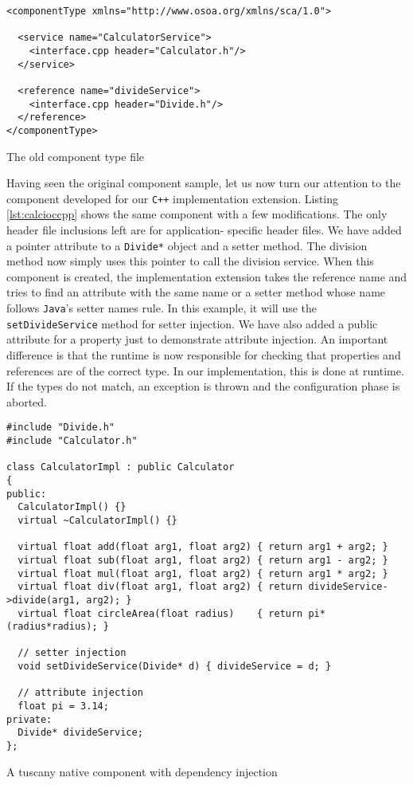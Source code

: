 \begin{listing}
\begin{verbatim}
<componentType xmlns="http://www.osoa.org/xmlns/sca/1.0">

  <service name="CalculatorService">
    <interface.cpp header="Calculator.h"/>
  </service>

  <reference name="divideService">
    <interface.cpp header="Divide.h"/>
  </reference>
</componentType>
\end{verbatim}
\caption{The old component type file}
\label{lst:calccppccomponenttype}
\end{listing}

Having seen the original component sample, let us now turn our attention to the component
developed for our \texttt{C++} implementation extension. Listing \ref{lst:calcioccpp} shows the same
component with a few modifications. The only header file inclusions left are for application-
specific header files. We have added a pointer attribute to a \texttt{Divide*} object and a
setter method. The division method now simply uses this pointer to call the division service.
When this component is created, the implementation extension takes the reference name and
tries to find an attribute with the same name or a setter method whose name follows \texttt{Java}'s
setter names rule. In this example, it will use the \texttt{setDivideService} method for
setter injection. We have also added a public attribute for a property just to demonstrate
attribute injection. An important difference is that the runtime is now responsible for
checking that properties and references are of the correct type. In our implementation, this
is done at runtime. If the types do not match, an exception is thrown and the configuration
phase is aborted.

\begin{listing}
\begin{verbatim}
#include "Divide.h"
#include "Calculator.h"

class CalculatorImpl : public Calculator
{
public:
  CalculatorImpl() {}
  virtual ~CalculatorImpl() {}

  virtual float add(float arg1, float arg2) { return arg1 + arg2; }
  virtual float sub(float arg1, float arg2) { return arg1 - arg2; }
  virtual float mul(float arg1, float arg2) { return arg1 * arg2; }
  virtual float div(float arg1, float arg2) { return divideService->divide(arg1, arg2); }
  virtual float circleArea(float radius)    { return pi*(radius*radius); }

  // setter injection
  void setDivideService(Divide* d) { divideService = d; }

  // attribute injection
  float pi = 3.14;
private:
  Divide* divideService;
};
\end{verbatim}
\caption{A tuscany native component with dependency injection}
\label{lst:calcioccpp}
\end{listing}

